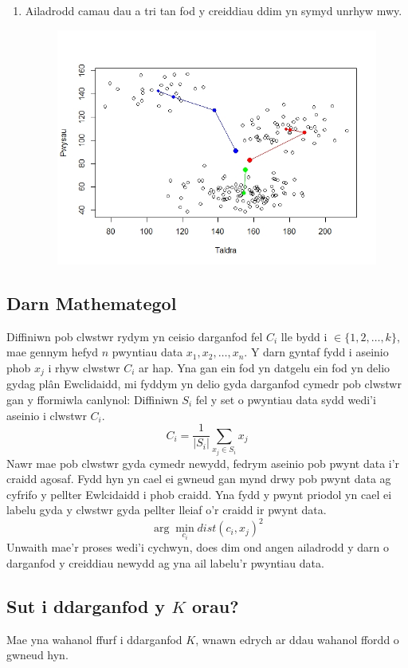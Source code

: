 \begin{enumerate}
\item Ailadrodd camau dau a tri tan fod y creiddiau ddim yn symyd unrhyw mwy.

\begin{figure}[h]
\begin{center}
\includegraphics[width=0.5\linewidth]{../img/Convergence4.jpeg}
\end{center}
\end{figure}

\end{enumerate}  

\subsection{Darn Mathemategol}

Diffiniwn pob clwstwr rydym yn ceisio darganfod fel $C_i$ lle bydd i $\in \{ 1, 2, \dots, k\}$, mae gennym hefyd $n$ pwyntiau data $x_1,x_2,\dots,x_n$. Y darn gyntaf fydd i aseinio phob $x_j$ i rhyw clwstwr $C_i$ ar hap. Yna gan ein fod yn datgelu ein fod yn delio gydag pl\^{a}n Ewclidaidd, mi fyddym yn delio gyda darganfod cymedr pob clwstwr gan y fformiwla canlynol:
Diffiniwn $S_i$ fel y set o pwyntiau data sydd wedi'i aseinio i clwstwr $C_i$.
$$ C_i = \frac{1}{|S_i|}\sum_{x_j \in S_i} {x_j} $$
Nawr mae pob clwstwr gyda cymedr newydd, fedrym aseinio pob pwynt data i'r craidd agosaf. Fydd hyn yn cael ei gwneud gan mynd drwy pob pwynt data ag cyfrifo y pellter Ewlcidaidd i phob craidd. Yna fydd y pwynt priodol yn cael ei labelu gyda y clwstwr gyda pellter lleiaf o'r craidd ir pwynt data.
$$ \arg \min_{c_i} dist(c_i,x_j)^2$$
Unwaith mae'r proses wedi'i cychwyn, does dim ond angen ailadrodd y darn o darganfod y creiddiau newydd ag yna ail labelu'r pwyntiau data.


\subsection{Sut i ddarganfod y $K$ orau?}

Mae yna wahanol ffurf i ddarganfod $K$, wnawn edrych ar ddau wahanol ffordd o gwneud hyn. 

